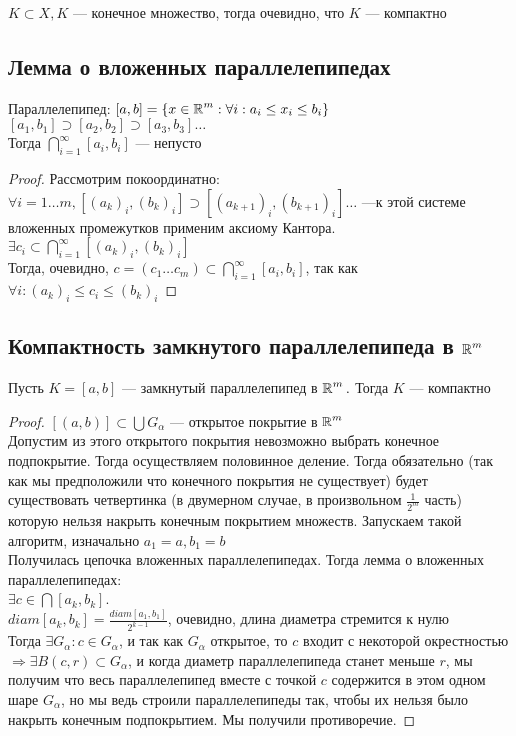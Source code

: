 	\begin{remark}
		$K \subset X, K$ --- конечное множество, тогда очевидно, что $K$ --- компактно	
	\end{remark}

\subsection{Лемма о вложенных параллелепипедах}
Параллелепипед: $[a,b] = \{x \in \operatorname*{\mathbb{R}}^m: \forall i: a_i \le x_i \le b_i \}$
		\\
		$[a_1, b_1] \supset [a_2, b_2] \supset [a_3, b_3]  \ldots $ \\
		Тогда $\bigcap\limits_{i = 1}^{\infty} [a_i, b_i] $ --- непусто
	
	\begin{proof}
		Рассмотрим покоординатно: \\
		$\forall i = 1 \ldots m, [(a_k)_i, (b_k)_i] \supset [(a_{k+1})_i, (b_{k+1})_i] \ldots $ ---к этой системе вложенных промежутков применим аксиому Кантора. \\
		$\exists c_i \subset \bigcap\limits_{i=1}^{\infty} [(a_k)_i, (b_k)_i]$ \\
		Тогда, очевидно, $c = (c_1 \ldots c_m) \subset \bigcap\limits_{i = 1}^{\infty} [a_i, b_i]$, так как $\forall i : (a_k)_i \le c_i \le (b_k)_i$
	\end{proof}

\subsection{Компактность замкнутого параллелепипеда в $\operatorname*{\mathbb{R}}^m$}
Пусть $K = [a,b]$ --- замкнутый параллелепипед в $\operatorname*{\mathbb{R}}^m. $ Тогда $K$ --- компактно
	  
	  \begin{proof}
	  	$[(a,b)] \subset \bigcup G_\alpha $ --- открытое покрытие в $\operatorname*{\mathbb{R}}^m$ \\
	  	Допустим из этого открытого покрытия невозможно выбрать конечное подпокрытие. Тогда осуществляем половинное деление. Тогда обязательно (так как мы предположили что конечного покрытия не существует) будет существовать четвертинка (в двумерном случае, в произвольном $\frac{1}{2^m}$ часть) которую нельзя накрыть конечным покрытием множеств. Запускаем такой алгоритм, изначально $a_1 = a, b_1 = b$  \\
	  	Получилась цепочка вложенных параллелепипедах. Тогда лемма о вложенных параллелепипедах: \\
	  	$\exists c \in \bigcap[a_k, b_k]$. \\
	  	$diam [a_k, b_k] = \frac{diam [a_1, b_1]}{2^{k-1}}$, очевидно, длина диаметра стремится к нулю \\
	  Тогда $\exists G_\alpha : c \in G_\alpha$, и так как $G_\alpha$ открытое, то $c$ входит с некоторой окрестностью $\Rightarrow \exists B(c,r) \subset G_\alpha$, и когда диаметр параллелепипеда станет меньше $r$, мы получим что весь параллелепипед вместе с точкой $c$ содержится в этом одном шаре $G_\alpha$, но мы ведь строили параллелепипеды так, чтобы их нельзя было накрыть конечным подпокрытием. Мы получили противоречие.  
	  \end{proof}
	  
